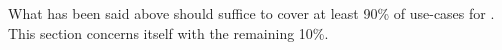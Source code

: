 
What has been said above should suffice to cover at least 90\% of use-cases for \qtest{}.
This section concerns itself with the remaining 10\%.
